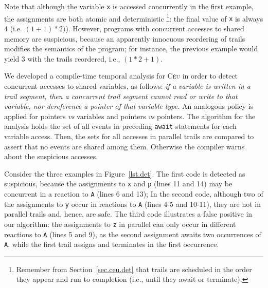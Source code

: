 \documentclass[letterpaper]{sig-alternate}
\newcommand{\code}[1] {{\small{\texttt{#1}}}}
\newcommand{\CEU}{\textsc{C\'{e}u}\xspace}
\begin{document}
Note that although the variable \code{x} is accessed concurrently in the first 
example, the assignments are both atomic and deterministic%
\footnote{
Remember from Section~\ref{sec.ceu.det} that trails are scheduled in the order 
they appear and run to completion (i.e., until they await or terminate).
}: the final value of \code{x} is always $4$ (i.e. {\small$(1+1)*2)$}).
%
However, programs with concurrent accesses to shared memory are suspicious, 
because an apparently innocuous reordering of trails modifies the semantics of 
the program; for instance, the previous example would yield $3$ with the trails 
reordered, i.e., {\small$(1*2+1)$}.


We developed a compile-time temporal analysis for \CEU in order to detect 
concurrent accesses to shared variables, as follows:
\emph{if a variable is written in a trail segment, then a concurrent trail 
segment cannot read or write to that variable, nor dereference a pointer of 
that variable type.}
An analogous policy is applied for pointers \emph{vs} variables and pointers 
\emph{vs} pointers.
The algorithm for the analysis holds the set of all events in preceding 
\code{await} statements for each variable access.
Then, the sets for all accesses in parallel trails are compared to assert that 
no events are shared among them.
Otherwise the compiler warns about the suspicious accesses.

Consider the three examples in Figure~\ref{lst.det}.
The first code is detected as suspicious, because the assignments to \code{x} 
and \code{p} (lines 11 and 14) may be concurrent in a reaction to \code{A} 
(lines 6 and 13);
%
In the second code, although two of the assignments to \code{y} occur in 
reactions to \code{A} (lines 4-5 and 10-11), they are not in parallel trails 
and, hence, are safe.
%
The third code illustrates a false positive in our algorithm: the assignments 
to \code{z} in parallel can only occur in different reactions to \code{A} 
(lines 5 and 9), as the second assignment awaits two occurrences of \code{A}, 
while the first trail assigns and terminates in the first occurrence.
\end{document}
